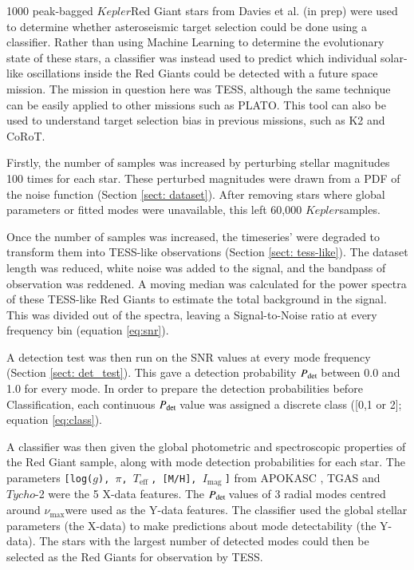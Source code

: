 \documentclass[a4paper,fleqn,usenatbib,useAMS]{mnras}
\newcommand{\numax}{\ensuremath{\nu_{\textrm{max}}}}
\newcommand{\teff}{\ensuremath{T_{\textrm{eff}}\:}}
\newcommand{\kep}{\ensuremath{Kepler}\:}
\newcommand{\pdet}{\ensuremath{P_{\rm det}\:}}
\newcommand{\imag}{\ensuremath{I_{\textrm{mag}}\:}}
\begin{document}
1000 peak-bagged \kep Red Giant stars from Davies et al. (in prep) were used to determine whether asteroseismic target selection could be done using a classifier. Rather than using Machine Learning to determine the evolutionary state of these stars, a classifier was instead used to predict which individual solar-like oscillations inside the Red Giants could be detected with a future space mission. The mission in question here was TESS, although the same technique can be easily applied to other missions such as PLATO. This tool can also be used to understand target selection bias in previous missions, such as K2 and CoRoT.


Firstly, the number of samples was increased by perturbing stellar magnitudes 100 times for each star. These perturbed magnitudes were drawn from a PDF of the noise function (Section \ref{sect: dataset}). After removing stars where global parameters or fitted modes were unavailable, this left 60,000 \kep samples. 

Once the number of samples was increased, the timeseries' were degraded to transform them into TESS-like observations (Section \ref{sect: tess-like}). The dataset length was reduced, white noise was added to the signal, and the bandpass of observation was reddened. A moving median was calculated for the power spectra of these TESS-like Red Giants to estimate the total background in the signal. This was divided out of the spectra, leaving a Signal-to-Noise ratio at every frequency bin (equation \ref{eq:snr}).

A detection test was then run on the SNR values at every mode frequency (Section \ref{sect: det_test}). This gave a detection probability \pdet between 0.0 and 1.0 for every mode. In order to prepare the detection probabilities before Classification, each continuous \pdet value was assigned a discrete class ([0,1 or 2]; equation \ref{eq:class}).

A classifier was then given the global photometric and spectroscopic properties of the Red Giant sample, along with mode detection probabilities for each star. The parameters \texttt{[log($g$), $\pi$, \teff, [M/H], \imag]} from APOKASC \citep{pinsonneault_apokasc_2014}, TGAS \citep{gaia_collaboration_gaia_2016} and $Tycho$-2 \citep{hog_tycho-2_2000} were the 5 X-data features. The \pdet values of 3 radial modes centred around \numax were used as the Y-data features. %
The classifier used the global stellar parameters (the X-data) to make predictions about mode detectability (the Y-data). The stars with the largest number of detected modes could then be selected as the Red Giants for observation by TESS. 
\end{document}
